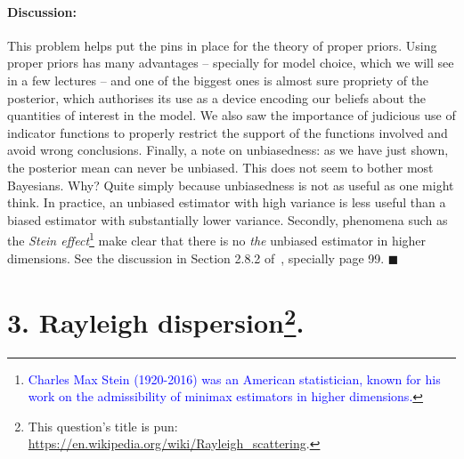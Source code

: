 \documentclass[a4paper,10pt, notitlepage]{report}
\begin{document}
{\paragraph{Discussion:} This problem helps put the pins in place for the theory of proper priors.
Using proper priors has many advantages -- specially for model choice, which we will see in a few lectures -- and one of the biggest ones is almost sure propriety of the posterior, which authorises its use as a device encoding our beliefs about the quantities of interest in the model.
We also saw the importance of judicious use of indicator functions to properly restrict the support of the functions involved and avoid wrong conclusions.
Finally, a note on unbiasedness: as we have just shown, the posterior mean can never be unbiased.
This does not seem to bother most Bayesians.
Why?
Quite simply because unbiasedness is not as useful as one might think.
In practice, an unbiased estimator with high variance is less useful than a biased estimator with substantially lower variance.
Secondly, phenomena such as the \textit{Stein effect}\footnote{\textcolor{blue}{Charles Max Stein (1920-2016) was an American statistician, known for his work on the admissibility of minimax estimators in higher dimensions.}} make clear that there is no \textit{the} unbiased estimator in higher dimensions.
See the discussion in Section 2.8.2 of~\cite{Robert2007}, specially page 99.
$\blacksquare$
}


\section*{3. Rayleigh dispersion\footnote{This question's title is pun: \url{https://en.wikipedia.org/wiki/Rayleigh_scattering}.}.}
\end{document}

